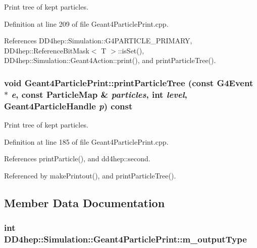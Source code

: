 Print tree of kept particles. 

Definition at line 209 of file Geant4ParticlePrint.cpp.

References DD4hep::Simulation::G4PARTICLE\_\-PRIMARY, DD4hep::ReferenceBitMask$<$ T $>$::isSet(), DD4hep::Simulation::Geant4Action::print(), and printParticleTree().\hypertarget{class_d_d4hep_1_1_simulation_1_1_geant4_particle_print_af53abc4bb399b2484761613a360b4063}{
\subsubsection[{printParticleTree}]{\setlength{\rightskip}{0pt plus 5cm}void Geant4ParticlePrint::printParticleTree (const G4Event $\ast$ {\em e}, \/  const {\bf ParticleMap} \& {\em particles}, \/  int {\em level}, \/  {\bf Geant4ParticleHandle} {\em p}) const}}
\label{class_d_d4hep_1_1_simulation_1_1_geant4_particle_print_af53abc4bb399b2484761613a360b4063}


Print tree of kept particles. 

Definition at line 185 of file Geant4ParticlePrint.cpp.

References printParticle(), and dd4hep::second.

Referenced by makePrintout(), and printParticleTree().

\subsection{Member Data Documentation}
\hypertarget{class_d_d4hep_1_1_simulation_1_1_geant4_particle_print_a0dc2b81ac74da2e496892d9cccf30f56}{
\subsubsection[{m\_\-outputType}]{\setlength{\rightskip}{0pt plus 5cm}int {\bf DD4hep::Simulation::Geant4ParticlePrint::m\_\-outputType}}}
\label{class_d_d4hep_1_1_simulation_1_1_geant4_particle_print_a0dc2b81ac74da2e496892d9cccf30f56}


